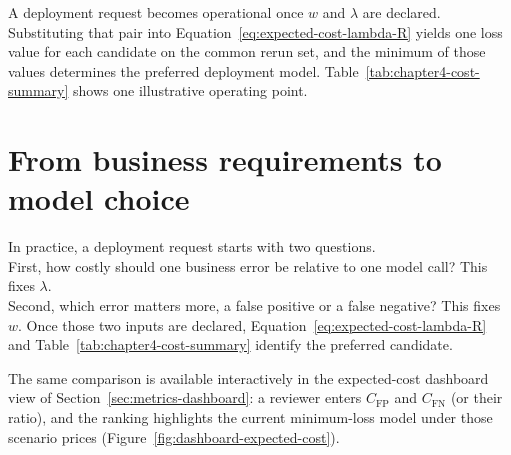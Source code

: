A deployment request becomes operational once \(w\) and \(\lambda\) are declared. Substituting that pair into Equation~\eqref{eq:expected-cost-lambda-R} yields one loss value for each candidate on the common rerun set, and the minimum of those values determines the preferred deployment model. Table~\ref{tab:chapter4-cost-summary} shows one illustrative operating point.

\section{From business requirements to model choice}
\label{sec:constraint-based-selection}

In practice, a deployment request starts with two questions.\\
First, how costly should one business error be relative to one model call? This fixes \(\lambda\).\\
Second, which error matters more, a false positive or a false negative? This fixes \(w\). Once those two inputs are declared, Equation~\eqref{eq:expected-cost-lambda-R} and Table~\ref{tab:chapter4-cost-summary} identify the preferred candidate.

The same comparison is available interactively in the expected-cost dashboard view of Section~\ref{sec:metrics-dashboard}: a reviewer enters \(C_{\mathrm{FP}}\) and \(C_{\mathrm{FN}}\) (or their ratio), and the ranking highlights the current minimum-loss model under those scenario prices (Figure~\ref{fig:dashboard-expected-cost}).

